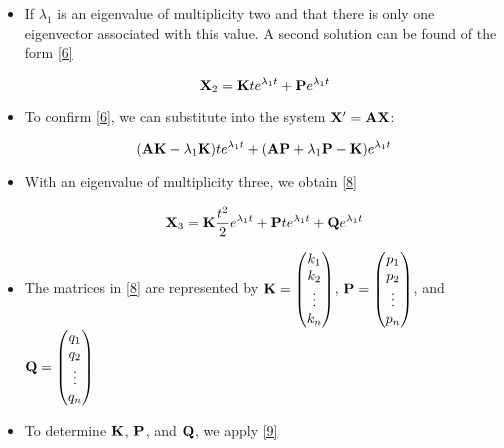 \documentclass[12pt]{article}
\begin{document}
\begin{itemize}
  \item If $\lambda_1$ is an eigenvalue of multiplicity two and that there is only one eigenvector associated with this value. A second solution can be found of the form \eqref{6}

    \begin{equation}
      \bold{X}_2=\bold{K}te^{\lambda_1t}+\bold{P}e^{\lambda_1t}
      \label{6}
    \end{equation}

  \item To confirm \eqref{6}, we can substitute into the system $\bold{X}'=\bold{AX}$:

    \begin{equation}
      (\bold{AK}-\lambda_1\bold{K})te^{\lambda_1t}+(\bold{AP}+\lambda_1\bold{P}-\bold{K})e^{\lambda_1t}
      \label{7}
    \end{equation}

  \item With an eigenvalue of multiplicity three, we obtain \eqref{8}

    \begin{equation}
      \bold{X}_3=\bold{K}\frac{t^2}{2}e^{\lambda_1 t}+\bold{P}te^{\lambda_1t} + \bold{Q}e^{\lambda_1t}
      \label{8}
    \end{equation}

  \item The matrices in \eqref{8} are represented by $\bold{K}=\begin{pmatrix} k_1 \\ k_2\\ \vdots \\ k_n \\ \end{pmatrix}$, $\bold{P}=\begin{pmatrix} p_1 \\ p_2\\ \vdots \\ p_n \\ \end{pmatrix}$, and $\bold{Q}=\begin{pmatrix} q_1 \\ q_2\\ \vdots \\ q_n \\ \end{pmatrix}$

  \item To determine $\bold{K}$, $\bold{P}$, and $\bold{Q}$, we apply \eqref{9}


\end{itemize}
\end{document}

